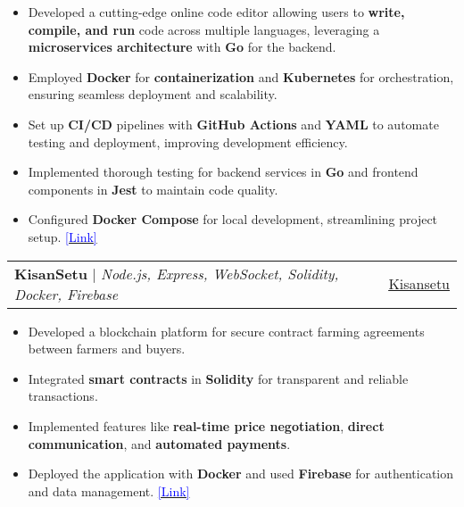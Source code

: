 \documentclass[letterpaper,11pt]{article}
\makeatletter
\newcommand{\resumeItem}[1]{
  \item\small{
    {#1 \vspace{-2pt}}
  }
}
\newcommand{\resumeProjectHeading}[2]{
    \item
    \begin{tabular*}{0.97\textwidth}{l@{\extracolsep{\fill}}r}
      \small#1 & #2 \\
    \end{tabular*}\vspace{-7pt}
}
\newcommand{\resumeItemListStart}{\begin{itemize}}
\newcommand{\resumeItemListEnd}{\end{itemize}\vspace{-5pt}}
\makeatother
\begin{document}
\resumeItemListStart
    \resumeItem{Developed a cutting-edge online code editor allowing users to \textbf{write, compile, and run} code across multiple languages, leveraging a \textbf{microservices architecture} with \textbf{Go} for the backend.}
    \resumeItem{Employed \textbf{Docker} for \textbf{containerization} and \textbf{Kubernetes} for orchestration, ensuring seamless deployment and scalability.}
    \resumeItem{Set up \textbf{CI/CD} pipelines with \textbf{GitHub Actions} and \textbf{YAML} to automate testing and deployment, improving development efficiency.}
    \resumeItem{Implemented thorough testing for backend services in \textbf{Go} and frontend components in \textbf{Jest} to maintain code quality.}
    \resumeItem{Configured \textbf{Docker Compose} for local development, streamlining project setup. \href{https://codebrewery.vercel.app}{\textcolor{blue}{[Link]}}}
\resumeItemListEnd





\resumeProjectHeading
{\textbf{KisanSetu} $|$ \footnotesize\emph{Node.js, Express, WebSocket, Solidity, Docker, Firebase}}{\faIcon{github}\href{https://github.com/slashexx/kisansetu}{\underline{Kisansetu}}}

\resumeItemListStart
    \resumeItem{Developed a blockchain platform for secure contract farming agreements between farmers and buyers.}
    \resumeItem{Integrated \textbf{smart contracts} in \textbf{Solidity} for transparent and reliable transactions.}
    \resumeItem{Implemented features like \textbf{real-time price negotiation}, \textbf{direct communication}, and \textbf{automated payments}.}
    \resumeItem{Deployed the application with \textbf{Docker} and used \textbf{Firebase} for authentication and data management. \href{kisansetu.onrender.com}{\textcolor{blue}{[Link]}}}
\resumeItemListEnd
        

\end{document}

